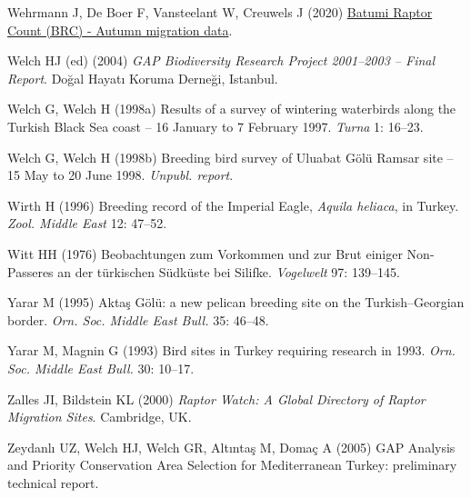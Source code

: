 \documentclass[
  letterpaper,
  DIV=11,
  numbers=noendperiod]{scrreprt}
\newlength{\cslhangindent}
\newenvironment{CSLReferences}[2] %
 {\begin{list}{}{%
  \setlength{\itemindent}{0pt}
  \setlength{\leftmargin}{0pt}
  \setlength{\parsep}{0pt}
  \ifodd #1
   \setlength{\leftmargin}{\cslhangindent}
   \setlength{\itemindent}{-1\cslhangindent}
  \fi
  \setlength{\itemsep}{#2\baselineskip}}}
 {\end{list}}
\begin{document}
\begin{CSLReferences}{0}{1}
Wehrmann J, De Boer F, Vansteelant W, Creuwels J (2020)
\href{https://doi.org/10.15468/UR0VNH}{{Batumi Raptor Count (BRC) -
Autumn migration data}}.

Welch HJ (ed) (2004) \emph{{GAP Biodiversity Research Project 2001--2003
-- Final Report}}. Doğal Hayatı Koruma Derneği, Istanbul.

Welch G, Welch H (1998a) {Results of a survey of wintering waterbirds
along the Turkish Black Sea coast -- 16 January to 7 February 1997}.
\emph{Turna} 1: 16--23.

Welch G, Welch H (1998b) {Breeding bird survey of Uluabat Gölü Ramsar
site -- 15 May to 20 June 1998}. \emph{Unpubl. report}.

Wirth H (1996) {Breeding record of the Imperial Eagle, \emph{Aquila
heliaca}, in Turkey}. \emph{Zool. Middle East} 12: 47--52.

Witt HH (1976) {Beobachtungen zum Vorkommen und zur Brut einiger
Non-Passeres an der türkischen Südküste bei Silifke}. \emph{Vogelwelt}
97: 139--145.

Yarar M (1995) {Aktaş Gölü: a new pelican breeding site on the
Turkish--Georgian border}. \emph{Orn. Soc. Middle East Bull.} 35:
46--48.

Yarar M, Magnin G (1993) {Bird sites in Turkey requiring research in
1993}. \emph{Orn. Soc. Middle East Bull.} 30: 10--17.

Zalles JI, Bildstein KL (2000) \emph{{Raptor Watch: A Global Directory
of Raptor Migration Sites}}. Cambridge, UK.

Zeydanlı UZ, Welch HJ, Welch GR, Altıntaş M, Domaç A (2005) {GAP
Analysis and Priority Conservation Area Selection for Mediterranean
Turkey: preliminary technical report}.

\end{CSLReferences}
\end{document}
